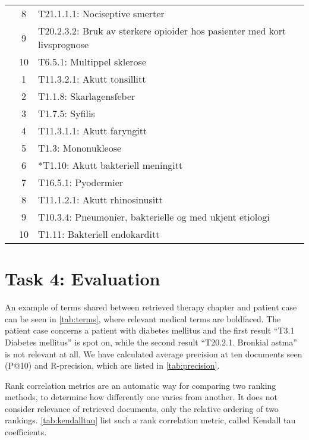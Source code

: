 \begin{table}[htbp]
\begin{tabularx}{\textwidth}{c c X}
	 & 8 & T21.1.1.1: Nociseptive smerter \\
	 & 9 & T20.2.3.2: Bruk av sterkere opioider hos pasienter med kort livsprognose \\
	 & 10 & T6.5.1: Multippel sklerose \\
	\addlinespace
	8 & 1 & T11.3.2.1: Akutt tonsillitt \\
	 & 2 & T1.1.8: Skarlagensfeber \\
	 & 3 & T1.7.5: Syfilis \\
	 & 4 & T11.3.1.1: Akutt faryngitt \\
	 & 5 & T1.3: Mononukleose \\
	 & 6 & *T1.10: Akutt bakteriell meningitt \\
	 & 7 & T16.5.1: Pyodermier \\
	 & 8 & T11.1.2.1: Akutt rhinosinusitt \\
	 & 9 & T10.3.4: Pneumonier, bakterielle og med ukjent etiologi \\
	 & 10 & T1.11: Bakteriell endokarditt \\
	\bottomrule
\end{tabularx}
\end{table}


\section{Task 4: Evaluation}
An example of terms shared between retrieved therapy
chapter and patient case can be seen in \autoref{tab:terms}, where
relevant medical terms are boldfaced. The patient case concerns a patient with
diabetes mellitus and the first result ``T3.1 Diabetes mellitus'' is spot on,
while the second result ``T20.2.1. Bronkial astma'' is not relevant at all.
We have calculated average precision at ten documents seen (P@10) and
R-precision, which are listed in \autoref{tab:precision}.

Rank correlation metrics are an automatic way for comparing two ranking
methods, to determine how differently one varies from another. It does not
consider relevance of retrieved documents, only the relative ordering of two
rankings. \autoref{tab:kendalltau} list such a rank correlation metric, called
Kendall tau coefficients.

